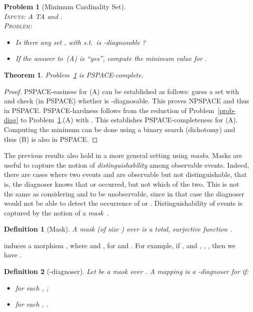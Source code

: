 \documentclass[letterpaper,10pt,conference]{ieeeconf}  \IEEEoverridecommandlockouts                              \overrideIEEEmargins
\def\st{{s.t.}~}
\newtheorem{prob}{Problem}  \newtheorem{definition}{Definition}
\newtheorem{theorem}{Theorem}
\def\endef{\ifmmode\squareforged\else{\unskip\nobreak\hfil
\penalty50\hskip1em\null\nobreak\hfil
\parfillskip=0pt\finalhyphendemerits=0\endgraf}\fi}
\begin{document}
\begin{prob}[Minimum Cardinality Set] \label{prob-static-minimum} \mbox{} \\
  \textsc{Inputs:} A  TA  and . \\
  \textsc{Problem:}
  \begin{itemize}
  \item[(A)] Is there any set , with
     \st  is -diagnosable ?
  \item[(B)] If the answer to~(A) is ``yes'', compute the minimum
    value for .
  \end{itemize}
\end{prob}
\begin{theorem}
  Problem~\ref{prob-static-minimum} is PSPACE-complete.
\end{theorem}
\begin{proof}
  PSPACE-easiness for (A) can be established as follows: guess a set
   with  and check (in PS\-PACE) whether  is
  -diagnosable. This proves  NPSPACE and thus in
  PSPACE.  PSPACE-hardness follows from the reduction of
  Problem~\ref{prob-diag} to Problem~\ref{prob-static-minimum}.(A)
  with .  This establishes PSPACE-completeness for (A).
  Computing the minimum  can be done using a binary search
  (dichotomy) and thus (B) is also in PSPACE.
\end{proof}

\medskip The previous results also hold in a more general setting
using \emph{masks}.  Masks are useful to capture the notion of
\emph{distinguishability} among observable events.  Indeed, there are
cases where two events  and  are observable but not
distinguishable, that is, the diagnoser knows that  or 
occurred, but not which of the two. This is not the same as
considering  and  to be unobservable, since in that case the
diagnoser would not be able to detect the occurrence of  or .
Distinguishability of events is captured by the notion of a
\emph{mask}~{\cite{Varaiyaetal88}}.

\begin{definition}[Mask]\label{def-mask}
  A \emph{mask}  (of size ) over  is a total,
  surjective function . \endef
\end{definition}
 induces a morphism , where
 and , for
 and .  For example, if
,  and ,
, , then we have .


\begin{definition}[-diagnoser]\label{def-mask-diag} Let
   be a mask over . A mapping  is a
  \emph{-diagnoser} for  if:
  \begin{itemize}
  \item for each ,
    ;
  \item for each ,
    . \endef
  \end{itemize}
\end{definition}
\end{document}
